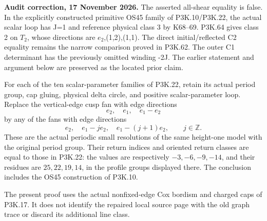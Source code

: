 \begin{theorem}\label{night:P3K.25}
\par\noindent\textbf{Audit correction, 17 November 2026.} The asserted all-shear equality is false. In the explicitly constructed primitive OS45 family of P3K.10/P3K.22, the actual scalar loop has J=1 and reference physical class 3 by K68--69. P3K.64 gives class 2 on \(T_2\), whose directions are \(e_2\),(1,2),(1,1). The direct initial/reflected C2 equality remains the narrow comparison proved in P3K.62. The outer C1 determinant has the previously omitted winding -2J. The earlier statement and argument below are preserved as the located prior claim.
\medskip

For each of the ten scalar-parameter families of P3K.22, retain its
actual period group, cap gluing, physical delta circle, and positive
scalar-parameter loop. Replace the vertical-edge cusp fan with edge
directions
\[
 e_2,\quad e_1,\quad e_1-e_2
\]
by any of the fans with edge directions
\[
 e_2,\quad e_1-j e_2,\quad e_1-(j+1)e_2,\qquad j\in\mathbb Z.
                                                        \tag{P3K.25.1}
\]
These are the actual periodic small resolutions of the same
height-one model with the original period group. Their return
indices and oriented return classes are equal to those in P3K.22:
the values are respectively \(-3,-6,-9,-14\), and their residues
are \(25,22,19,14\), in the profile groups displayed there.
The conclusion includes the OS45 construction of P3K.10.

The present proof uses the actual nonfixed-edge Cox bordism and
charged caps of P3K.17. It does not identify the repaired local
source page with the old graph trace or discard its additional
line class.
\end{theorem}
